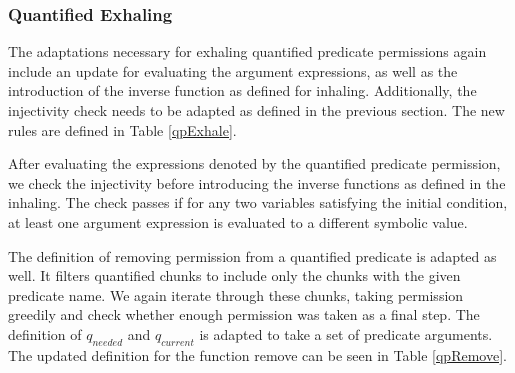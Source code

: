 \documentclass[12pt]{article}
\begin{document}
\subsubsection{Quantified Exhaling} 
\label{qpExhaleSec}
The adaptations necessary for exhaling quantified predicate permissions again include an update for evaluating the argument expressions, as well as the introduction of the inverse function as defined for inhaling. Additionally, the injectivity check needs to be adapted as defined in the previous section. The new rules are defined in Table \ref{qpExhale}.

After evaluating the expressions denoted by the quantified predicate permission, we check the injectivity before introducing the inverse functions as defined in the inhaling. The check passes if for any two variables satisfying the initial condition,  at least one argument expression is evaluated to a different symbolic value.

The definition of removing permission from a quantified predicate is adapted as well. It filters quantified chunks to include only the chunks with the given predicate name. We again iterate through these chunks, taking permission greedily and check whether enough permission was taken as a final step. The definition of \(q_{needed}\) and \(q_{current}\) is adapted to take a set of predicate arguments. The updated definition for the function remove can be seen in Table \ref{qpRemove}.
\end{document}
